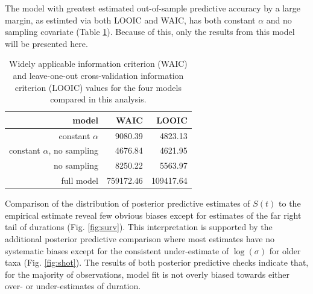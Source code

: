 \documentclass{article}
\begin{document}
The model with greatest estimated out-of-sample predictive accuracy by a large margin, as estimted via both LOOIC and WAIC, has both constant \(\alpha\) and no sampling covariate (Table \ref{tab:comparison}). Because of this, only the results from this model will be presented here. 

\begin{table}[ht]
  \centering
  \caption{Widely applicable information criterion (WAIC) and leave-one-out cross-validation information criterion (LOOIC) values for the four models compared in this analysis.}
  \begin{tabular}{ r r r }
    \hline
    model & \uppercase{waic} & \uppercase{looic} \\ 
    \hline
    constant \(\alpha\) & 9080.39 & 4823.13 \\ 
    constant \(\alpha\), no sampling & 4676.84 & 4621.95 \\ 
    no sampling & 8250.22 & 5563.97 \\ 
    full model & 759172.46 & 109417.64 \\ 
    \hline
  \end{tabular}
  \label{tab:comparison}
\end{table}


Comparison of the distribution of posterior predictive estimates of \(S(t)\) to the empirical estimate reveal few obvious biases except for estimates of the far right tail of durations (Fig. \ref{fig:surv}). This interpretation is supported by the additional posterior predictive comparison where most estimates have no systematic biases except for the consistent under-estimate of \(\log(\sigma)\) for older taxa (Fig. \ref{fig:shot}). The results of both posterior predictive checks indicate that, for the majority of observations, model fit is not overly biased towards either over- or under-estimates of duration.
\end{document}
